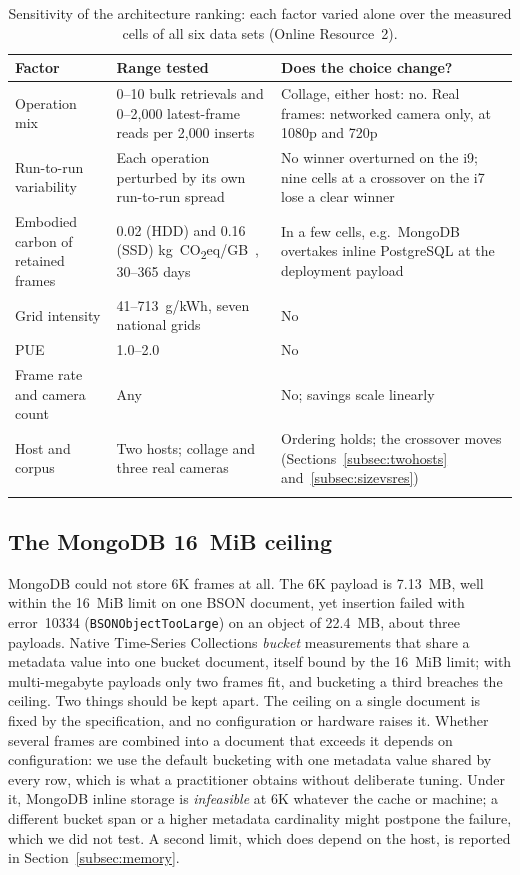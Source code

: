 \documentclass[pdflatex,sn-basic]{sn-jnl}%
\begin{document}
\begin{table}[htbp]
\caption{Sensitivity of the architecture ranking: each factor varied alone over the measured cells of all six data sets (Online Resource~2).}\label{tab:robustness}
\small
\begin{tabular}{@{}L{0.2\textwidth}L{0.33\textwidth}L{0.4\textwidth}@{}}
\toprule
Factor & Range tested & Does the choice change? \\
\midrule
Operation mix & 0--10 bulk retrievals and 0--2{,}000 latest-frame reads per 2{,}000 inserts & Collage, either host: no. Real frames: networked camera only, at 1080p and 720p \\
Run-to-run variability & Each operation perturbed by its own run-to-run spread & No winner overturned on the i9; nine cells at a crossover on the i7 lose a clear winner \\
Embodied carbon of retained frames & 0.02 (HDD) and 0.16 (SSD) kg~CO\textsubscript{2}eq/GB~\citep{tannu_ssd_embodied}, 30--365 days & In a few cells, e.g.\ MongoDB overtakes inline PostgreSQL at the deployment payload \\
Grid intensity & 41--713~g/kWh, seven national grids & No \\
PUE & 1.0--2.0 & No \\
Frame rate and camera count & Any & No; savings scale linearly \\
Host and corpus & Two hosts; collage and three real cameras & Ordering holds; the crossover moves (Sections~\ref{subsec:twohosts} and~\ref{subsec:sizevsres}) \\
\botrule
\end{tabular}
\end{table}

\subsection{The MongoDB 16~MiB ceiling}\label{subsec:bson}
MongoDB could not store 6K frames at all. The 6K payload is 7.13~MB, well within the 16~MiB limit on one BSON document, yet insertion failed with error~10334 (\texttt{BSONObjectTooLarge}) on an object of 22.4~MB, about three payloads. Native Time-Series Collections \emph{bucket} measurements that share a metadata value into one bucket document, itself bound by the 16~MiB limit; with multi-megabyte payloads only two frames fit, and bucketing a third breaches the ceiling. Two things should be kept apart. The ceiling on a single document is fixed by the specification, and no configuration or hardware raises it. Whether several frames are combined into a document that exceeds it depends on configuration: we use the default bucketing with one metadata value shared by every row, which is what a practitioner obtains without deliberate tuning. Under it, MongoDB inline storage is \emph{infeasible} at 6K whatever the cache or machine; a different bucket span or a higher metadata cardinality might postpone the failure, which we did not test. A second limit, which does depend on the host, is reported in Section~\ref{subsec:memory}.
\end{document}
